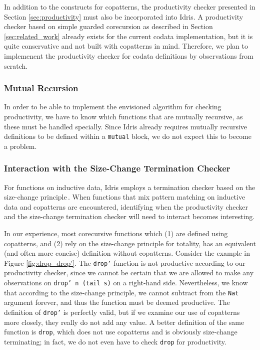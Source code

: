 

In addition to the constructs for copatterns, the productivity checker presented in Section \ref{sec:productivity} must also be incorporated into Idris. A productivity checker based on simple guarded corecursion as described in Section \ref{sec:related_work} already exists for the current codata implementation, but it is quite conservative and not built with copatterns in mind. Therefore, we plan to implemenent the productivity checker for codata definitions by observations from scratch.

\subsubsection{Mutual Recursion}
In order to be able to implement the envisioned algorithm for checking productivity, we have to know which functions that are mutually recursive, as these must be handled specially. Since Idris already requires mutually recursive definitions to be defined within a \texttt{mutual} block, we do not expect this to become a problem.

\subsubsection{Interaction with the Size-Change Termination Checker}
For functions on inductive data, Idris employs a termination checker based on the size-change principle\,\citep{LeeJones01SizeChange}. When functions that mix pattern matching on inductive data and copatterns are encountered, identifying when the productivity checker and the size-change termination checker will need to interact becomes interesting.

In our experience, most corecursive functions which (1) are defined using copatterns, and (2) rely on the size-change principle for totality, has an equivalent (and often more concise) definition without copatterns. Consider the example in Figure \ref{fig:drop_drop'}. The \texttt{drop'} function is not productive according to our productivity checker, since we cannot be certain that we are allowed to make any observations on \texttt{drop' n (tail s)} on a right-hand side. Nevertheless, we know that according to the size-change principle, we cannot subtract from the \texttt{Nat} argument forever, and thus the function must be deemed productive. The definition of \texttt{drop'} is perfectly valid, but if we examine our use of copatterns more closely, they really do not add any value. A better definition of the same function is \texttt{drop}, which does not use copatterns and is obviously size-change terminating; in fact, we do not even have to check \texttt{drop} for productivity. 

